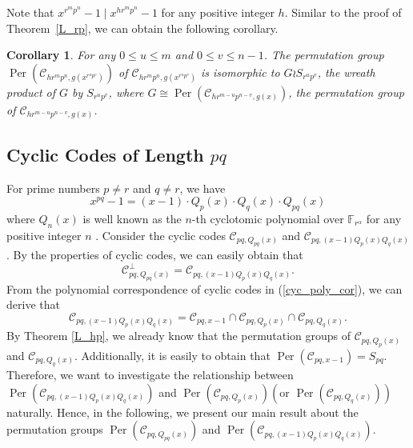 \documentclass[journal,12pt,onecolumn]{IEEEtran}
\newtheorem{corollary}[theorem]{Corollary}
\begin{document}
 
Note that $x^{r^mp^n}-1\mid x^{hr^mp^n}-1$ for any positive integer $h$. Similar to the proof of Theorem~\ref{L_rp}, we can obtain the following corollary. 

 
\begin{corollary}\label{L_rp_col}
    For any $0\le u\le m$ and $0\le v\le n-1$. The permutation group $\operatorname{Per}(\mathcal{C}_{hr^mp^n,g(x^{r^up^v})})$ of $\mathcal{C}_{hr^mp^n,g(x^{r^up^v})}$ is isomorphic to $G \wr S_{r^up^v}$, the wreath product of \(G\) by \(S_{r^up^v}\), where $G\cong \operatorname{Per}(\mathcal{C}_{hr^{m-u}p^{n-v},g(x)})$, the permutation group of $\mathcal{C}_{hr^{m-u}p^{n-v},g(x)}$. 
\end{corollary}
 









\subsection{Cyclic Codes of Length $pq$}

For prime numbers $p\neq r$ and $q\neq r$, we have
\[
    x^{pq} - 1 = (x-1)\cdot Q_p(x)\cdot Q_q(x)\cdot Q_{pq}(x) 
\]
where $Q_{n}(x)$ is well known as the $n$-th cyclotomic polynomial over $\mathbb{F}_{r^\alpha}$ for any positive integer $n$ \cite[Chap. 2]{Lidl_Niederreiter_1996}. Consider the cyclic codes $\mathcal{C}_{pq,Q_{pq}(x)}$ and $\mathcal{C}_{pq,(x-1)Q_p(x)Q_q(x)}$. By the properties of cyclic codes, we can easily obtain that 
\[
    \mathcal{C}_{pq,Q_{pq}(x)}^\perp = \mathcal{C}_{pq,(x-1)Q_p(x)Q_q(x)}. 
\]
From the polynomial correspondence of cyclic codes in (\ref{cyc_poly_cor}), we can derive that 
\[
    \mathcal{C}_{pq,(x-1)Q_p(x)Q_q(x)} = \mathcal{C}_{pq,x-1}\cap\mathcal{C}_{pq,Q_p(x)}\cap\mathcal{C}_{pq,Q_q(x)}. 
\]
By Theorem \ref{L_hp}, we already know that the permutation groups of $\mathcal{C}_{pq,Q_p(x)}$ and $\mathcal{C}_{pq,Q_q(x)}$. Additionally, it is easily to obtain that $\operatorname{Per}(\mathcal{C}_{pq,x-1}) = S_{pq}$. Therefore, we want to investigate the relationship between $\operatorname{Per}(\mathcal{C}_{pq,(x-1)Q_p(x)Q_q(x)})$ and $\operatorname{Per}(\mathcal{C}_{pq,Q_p(x)})(\text{or }\operatorname{Per}(\mathcal{C}_{pq,Q_q(x)}))$ naturally. Hence, in the following, we present our main result about the permutation groups $\operatorname{Per}(\mathcal{C}_{pq,Q_{pq}(x)})$ and $\operatorname{Per}(\mathcal{C}_{pq,(x-1)Q_p(x)Q_q(x)})$.
\end{document}
